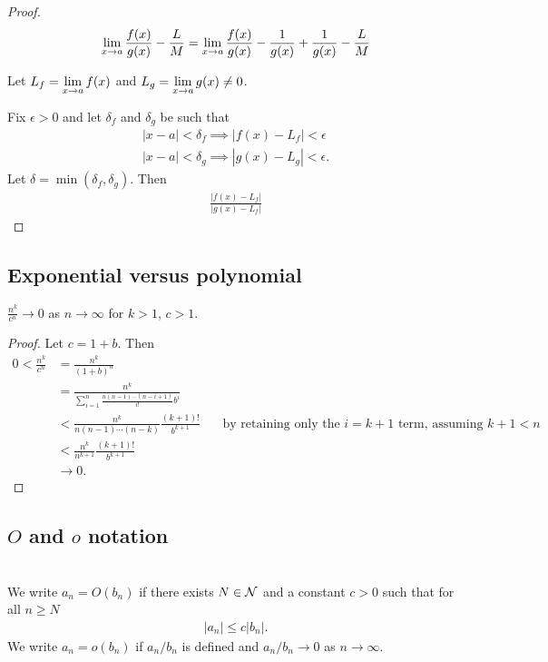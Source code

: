 \begin{proof}
  \begin{align*}
    \limxa \frac{f(x)}{g(x)} - \frac{L}{M}
    = \limxa \frac{f(x)}{g(x)} - \frac{1}{g(x)} + \frac{1}{g(x)} - \frac{L}{M}
  \end{align*}

  Let $L_f = \limxa f(x)$ and $L_g = \limxa g(x) \neq 0$.

  Fix $\epsilon > 0$ and let $\delta_f$ and $\delta_g$ be such that
  \begin{align*}
    |x - a| < \delta_f \implies |f(x) - L_f| < \epsilon\\
    |x - a| < \delta_g \implies |g(x) - L_g| < \epsilon.
  \end{align*}
  Let $\delta = \min(\delta_f, \delta_g)$. Then
  \begin{align*}
    \frac{|f(x) - L_f|}{|g(x) - L_f|}
  \end{align*}
\end{proof}

\subsection{Exponential versus polynomial}
\begin{theorem*}
  $\frac{n^k}{c^n} \to 0$ as $n \to \infty$ for $k > 1$, $c > 1$.
\end{theorem*}
\begin{proof}
  Let $c = 1 + b$. Then
  \begin{align*}
    0
    < \frac{n^k}{c^n}
    &= \frac{n^k}{(1 + b)^n}\\
    &= \frac{n^k}{\sum_{i=1}^n\frac{n(n-1)\cdots(n-i+1)}{i!}b^i}\\
    &< \frac{n^k}{n(n-1)\cdots(n-k)}\frac{(k+1)!}{b^{k+1}} ~~~~~~~~\text{by retaining only the $i = k+1$ term, assuming $k+1 < n$}\\
    &< \frac{n^k}{n^{k+1}}\frac{(k+1)!}{b^{k+1}}\\
    &\to 0.
  \end{align*}
\end{proof}

\subsection{$O$ and $o$ notation}
\begin{definition*}~\\
  We write $a_n = O(b_n)$ if there exists $N \in \mathcal{N}$ and a constant $c > 0$ such that for all
  $n \geq N$
  \begin{align*}
    |a_n| \leq c|b_n|.
  \end{align*}
  We write $a_n = o(b_n)$ if $a_n/b_n$ is defined and $a_n/b_n \to 0$ as
  $n \to \infty$.
\end{definition*}

